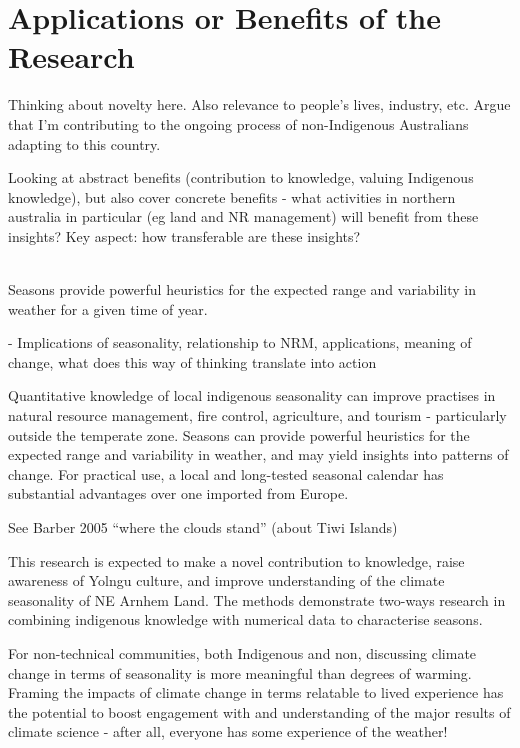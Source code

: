 \section{Applications or Benefits of the Research}
\label{sec:applications-benefits}

Thinking about novelty here.  Also relevance to people's lives,
industry, etc.  Argue that I'm contributing to the ongoing process
of non-Indigenous Australians adapting to this country.

Looking at abstract benefits (contribution to knowledge, valuing Indigenous knowledge),
but also cover concrete benefits - what activities in northern australia
in particular (eg land and NR management) will benefit from these insights?
Key aspect: how transferable are these insights?

~\\

Seasons provide powerful heuristics for the expected range and variability in
weather for a given time of year.

-	Implications of seasonality, relationship to NRM, applications, meaning of
change, what does this way of thinking translate into action


Quantitative knowledge of local indigenous seasonality can improve practises in
natural resource management, fire control, agriculture, and tourism -
particularly outside the temperate zone.  Seasons can provide powerful
heuristics for the expected range and variability in weather, and may yield
insights into patterns of change.  For practical use, a local and long-tested
seasonal calendar has substantial advantages over one imported from Europe.


See Barber 2005 ``where the clouds stand'' (about Tiwi Islands)

This research is expected to make a novel contribution to knowledge, raise
awareness of Yolngu culture, and improve understanding of the climate
seasonality of NE Arnhem Land.  The methods demonstrate two-ways research in
combining indigenous knowledge with numerical data to characterise seasons.

For non-technical communities, both Indigenous and non, discussing climate
change in terms of seasonality is more meaningful than degrees of warming.
Framing the impacts of climate change in terms relatable to lived experience
has the potential to boost engagement with and understanding of the major
results of climate science - after all, everyone has some experience of the
weather!

